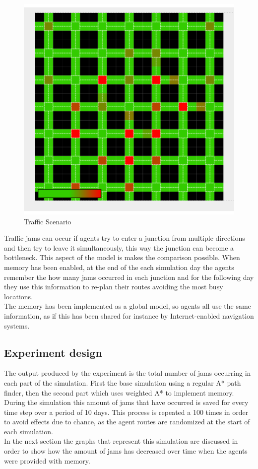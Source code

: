\documentclass[a4paper,hidelinks]{article}
\begin{document}
\begin{figure}[ht!]
\centering
\includegraphics[width = 0.7\linewidth]{grid}
\caption{Traffic Scenario \label{fig:grid}}
\end{figure} 

Traffic jams can occur if agents try to enter a junction from multiple directions and then try to leave it simultaneously, this way the junction can become a bottleneck. This aspect of the model is makes the comparison possible. When memory has been enabled, at the end of the each simulation day the agents remember the how many jams occurred in each junction and for the following day they use this information to re-plan their routes avoiding the most busy locations. \\
The memory has been implemented as a global model, so agents all use the same information, as if this has been shared for instance by Internet-enabled navigation systems.

\subsection{Experiment design}

The output produced by the experiment is the total number of jams occurring in each part of the simulation. First the base simulation using a regular A* path finder, then the second part which uses weighted A* to implement memory.
During the simulation this amount of jams that have occurred is saved for every time step over a period of 10 days. This process is repeated a 100 times in order to avoid effects due to chance, as the agent routes are randomized at the start of each simulation. \\
In the next section the graphs that represent this simulation are discussed in order to show how the amount of jams has decreased over time when the agents were provided with memory.  
\end{document}
